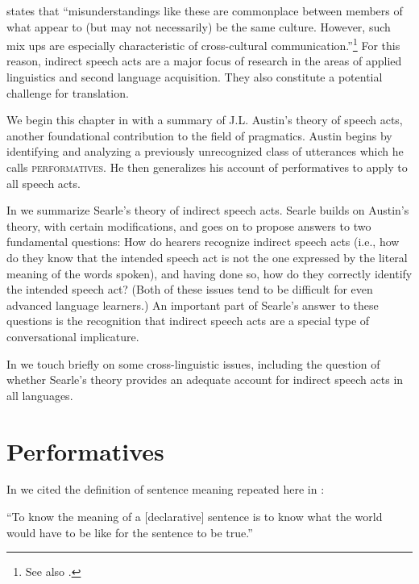 \citet{Tannen1981} states that “misunderstandings like these are commonplace between members of what appear to (but may not necessarily) be the same culture. However, such mix ups are especially characteristic of cross-cultural communication.”\footnote{See also \citet{Tannen1975,Tannen1986}.} For this reason, indirect speech acts are a major focus of research in the areas of applied linguistics and second language acquisition. They also constitute a potential challenge for translation.



We begin this chapter in  with a summary of J.L. Austin’s theory of speech acts, another foundational contribution to the field of pragmatics. Austin begins by identifying and analyzing a previously unrecognized class of utterances which he calls \textsc{performatives}. He then generalizes his account of performatives to apply to all speech acts.



In  we summarize Searle’s theory of indirect speech acts. Searle builds on Austin’s theory, with certain modifications, and goes on to propose answers to two fundamental questions: How do hearers recognize indirect speech acts (i.e., how do they know that the intended speech act is not the one expressed by the literal meaning of the words spoken), and having done so, how do they correctly identify the intended speech act? (Both of these issues tend to be difficult for even advanced language learners.) An important part of Searle’s answer to these questions is the recognition that indirect speech acts are a special type of conversational implicature.



In  we touch briefly on some cross-linguistic issues, including the question of whether Searle’s theory provides an adequate account for indirect speech acts in all languages.


\section{Performatives} \label{sec:10.2}

In  we cited the definition of sentence meaning repeated here in :


\eanoraggedright \label{ex:10.1}
“To know the meaning of a [declarative] sentence is to know what the world would have to be like for the sentence to be true.”\\\hbox{}\hfill\hbox{\citep[4]{DowtyEtAl1981}}
\z


